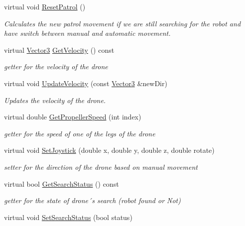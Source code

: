 \begin{DoxyCompactItemize}
virtual void \hyperlink{classBatteryDecorator_a36bd4557608043a6934b8c5d73ad511e}{Reset\+Patrol} ()
\begin{DoxyCompactList}\small\item\em Calculates the new patrol movement if we are still searching for the robot and have switch between manual and automatic movement. \end{DoxyCompactList}\item 
virtual \hyperlink{classVector3}{Vector3} \hyperlink{classBatteryDecorator_a978565b772172669437ffec923349f32}{Get\+Velocity} () const
\begin{DoxyCompactList}\small\item\em getter for the velocity of the drone \end{DoxyCompactList}\item 
virtual void \hyperlink{classBatteryDecorator_aad635fd483288cdcc46892da5265ca49}{Update\+Velocity} (const \hyperlink{classVector3}{Vector3} \&new\+Dir)
\begin{DoxyCompactList}\small\item\em Updates the velocity of the drone. \end{DoxyCompactList}\item 
virtual double \hyperlink{classBatteryDecorator_a361154605b803347aea2422cae7d0183}{Get\+Propeller\+Speed} (int index)
\begin{DoxyCompactList}\small\item\em getter for the speed of one of the legs of the drone \end{DoxyCompactList}\item 
virtual void \hyperlink{classBatteryDecorator_abb1ece4f26ac33daefd53a56180721eb}{Set\+Joystick} (double x, double y, double z, double rotate)
\begin{DoxyCompactList}\small\item\em setter for the direction of the drone based on manual movement \end{DoxyCompactList}\item 
virtual bool \hyperlink{classBatteryDecorator_aa0358ef7a9aee0f4942d32ad15ce4675}{Get\+Search\+Status} () const
\begin{DoxyCompactList}\small\item\em getter for the state of drone´s search (robot found or Not) \end{DoxyCompactList}\item 
virtual void \hyperlink{classBatteryDecorator_a41d8c8512cf82484120a9f3f951c4c2b}{Set\+Search\+Status} (bool status)

\end{DoxyCompactItemize}

